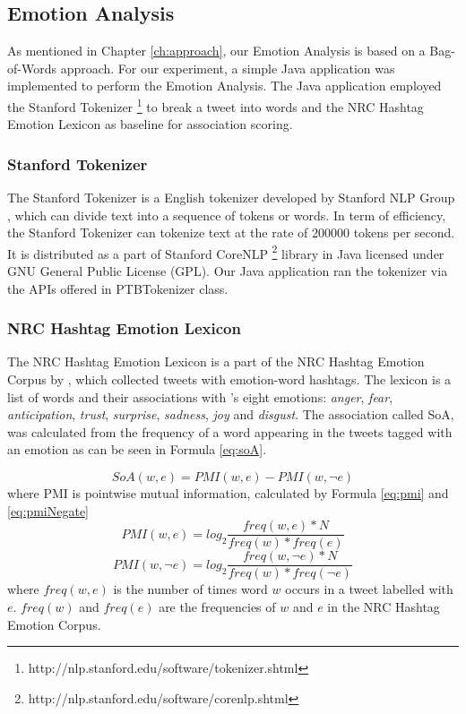 \subsection{Emotion Analysis}
As mentioned in Chapter \ref{ch:approach}, our Emotion Analysis is based on a Bag-of-Words approach. For our experiment, a simple Java application was implemented to perform the Emotion Analysis. The Java application employed the Stanford Tokenizer \footnote{http://nlp.stanford.edu/software/tokenizer.shtml} to break a tweet into words and the NRC Hashtag Emotion Lexicon \citep{mohammad2014using} as baseline for association scoring.

\subsubsection{Stanford Tokenizer}
The Stanford Tokenizer is a English tokenizer developed by Stanford NLP Group \citep{manning-EtAl:2014:P14-5}, which can divide text into a sequence of tokens or words. In term of efficiency, the Stanford Tokenizer can tokenize text at the rate of 200000 tokens per second. It is distributed as a part of Stanford CoreNLP \footnote{http://nlp.stanford.edu/software/corenlp.shtml} library in Java licensed under GNU General Public License (GPL). Our Java application ran the tokenizer via the APIs offered in PTBTokenizer class.

\subsubsection{NRC Hashtag Emotion Lexicon}
The NRC Hashtag Emotion Lexicon is a part of the NRC Hashtag Emotion Corpus by \citet{mohammad2014using}, which collected tweets with emotion-word hashtags. The lexicon is a list of words and their associations with \citep{plutchik2001nature}'s eight emotions: \textit{anger}, \textit{fear}, \textit{anticipation}, \textit{trust}, \textit{surprise}, \textit{sadness}, \textit{joy} and \textit{disgust}. The association called SoA, was calculated from the frequency of a word appearing in the tweets tagged with an emotion as can be seen in Formula \ref{eq:soA}.

\begin{equation}
\label{eq:soA}
	SoA(w, e) = PMI(w, e) - PMI(w, \neg{e})
\end{equation}
where PMI is pointwise mutual information, calculated by Formula \ref{eq:pmi} and \ref{eq:pmiNegate}
\begin{equation}
\label{eq:pmi}
	PMI(w, e) = log_2\frac{freq(w, e) * N}{freq(w) * freq(e)}
\end{equation}
\begin{equation}
\label{eq:pmiNegate}
	PMI(w, \neg{e}) = log_2\frac{freq(w, \neg{e}) * N}{freq(w) * freq(\neg{e})}	
\end{equation}
where \(freq(w,e)\) is the number of times word \(w\) occurs in a tweet labelled with \(e\). \(freq(w)\) and \(freq(e)\) are the frequencies of \(w\) and \(e\) in the NRC Hashtag Emotion Corpus.

